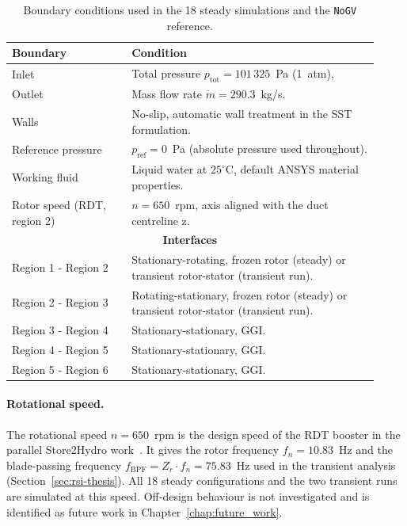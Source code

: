\begin{table}[h!]
  \centering
  \caption[Boundary conditions]{Boundary conditions used in the 18 steady simulations and the \texttt{NoGV} reference.}
  \label{tab:bc_master}
  \small
  \begin{tabular}{p{0.30\linewidth} p{0.62\linewidth}}
    \toprule
    \textbf{Boundary} & \textbf{Condition} \\
    \midrule
    Inlet
        & Total pressure $p_{\mathrm{tot}} = 101\,325$~Pa (1~atm), \\
    Outlet
        & Mass flow rate $\dot m = 290.3$~kg/s. \\
    Walls
        & No-slip, automatic wall treatment in the SST formulation. \\
    Reference pressure
        & $p_{\mathrm{ref}} = 0$~Pa (absolute pressure used throughout). \\
    Working fluid
        & Liquid water at $25^\circ$C, default ANSYS material properties. \\
    Rotor speed (RDT, region 2)
        & $n = 650$~rpm, axis aligned with the duct centreline z. \\
    \midrule
    \multicolumn{2}{c}{\textbf{Interfaces}} \\
    \midrule
    Region 1 - Region 2
        & Stationary-rotating, frozen rotor (steady) or transient rotor-stator (transient run). \\
    Region 2 - Region 3
        & Rotating-stationary, frozen rotor (steady) or transient rotor-stator (transient run). \\
    Region 3 - Region 4
        & Stationary-stationary, GGI. \\
    Region 4 - Region 5
        & Stationary-stationary, GGI. \\
    Region 5 - Region 6
        & Stationary-stationary, GGI. \\
    \bottomrule
  \end{tabular}
\end{table}
 
\paragraph{Rotational speed.}
The rotational speed $n = 650$~rpm is the design speed of the RDT booster in the parallel Store2Hydro work~\cite{DjupeslandTrivedi2025}. It gives the rotor frequency $f_n = 10.83$~Hz and the blade-passing frequency $f_{\mathrm{BPF}} = Z_r \cdot f_n = 75.83$~Hz used in the transient analysis (Section~\ref{sec:rsi-thesis}). All 18 steady configurations and the two transient runs are simulated at this speed. Off-design behaviour is not investigated and is identified as future work in Chapter~\ref{chap:future_work}.
 
